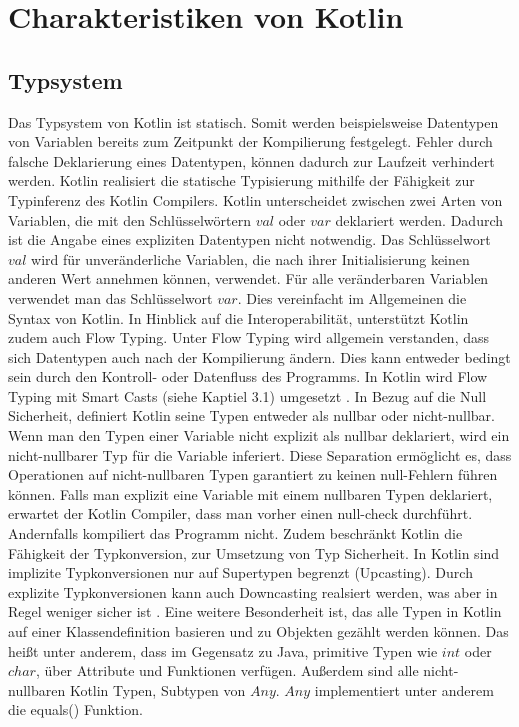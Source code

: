 \documentclass{article}
\begin{document}
\section{Charakteristiken von Kotlin}
\subsection{Typsystem}
Das Typsystem von Kotlin ist statisch. Somit werden beispielsweise Datentypen von Variablen bereits zum Zeitpunkt der Kompilierung festgelegt. Fehler durch falsche Deklarierung eines Datentypen, können dadurch zur Laufzeit verhindert werden. Kotlin realisiert die statische Typisierung mithilfe der Fähigkeit zur Typinferenz des Kotlin Compilers. Kotlin unterscheidet zwischen zwei Arten von Variablen, die mit den Schlüsselwörtern $val$ oder $var$ deklariert werden.  Dadurch ist die Angabe eines expliziten Datentypen nicht notwendig. Das Schlüsselwort $val$ wird für unveränderliche Variablen, die nach ihrer Initialisierung keinen anderen Wert annehmen können, verwendet. Für alle veränderbaren Variablen verwendet man das Schlüsselwort $var$. Dies vereinfacht im Allgemeinen die Syntax von Kotlin. In Hinblick auf die Interoperabilität, unterstützt Kotlin zudem auch Flow Typing. Unter Flow Typing wird allgemein verstanden, dass sich Datentypen auch nach der Kompilierung ändern. Dies kann entweder bedingt sein durch den Kontroll- oder Datenfluss des Programms. In Kotlin wird Flow Typing mit Smart Casts (siehe Kaptiel 3.1) umgesetzt \cite{KotlinLangSpec}. \newline
In Bezug auf die Null Sicherheit, definiert Kotlin seine Typen entweder als nullbar oder nicht-nullbar. Wenn man den Typen einer Variable nicht explizit als nullbar deklariert, wird ein nicht-nullbarer Typ für die Variable inferiert. Diese Separation ermöglicht es, dass Operationen auf nicht-nullbaren Typen garantiert zu keinen null-Fehlern führen können. Falls man explizit eine Variable mit einem nullbaren Typen deklariert, erwartet der Kotlin Compiler, dass man vorher einen null-check durchführt. Andernfalls kompiliert das Programm nicht. Zudem beschränkt Kotlin die Fähigkeit der Typkonversion, zur Umsetzung von Typ Sicherheit. In Kotlin sind implizite Typkonversionen nur auf Supertypen begrenzt (Upcasting). Durch explizite Typkonversionen kann auch Downcasting realsiert werden, was aber in Regel weniger sicher ist \cite{KotlinLangSpec}.\newline
Eine weitere Besonderheit ist, das alle Typen in Kotlin auf einer Klassendefinition basieren und zu Objekten gezählt werden können. Das heißt unter anderem, dass im Gegensatz zu Java, primitive Typen wie $int$ oder $char$, über Attribute und Funktionen verfügen. Außerdem sind alle nicht-nullbaren Kotlin Typen, Subtypen von $Any$. $Any$ implementiert unter anderem die equals() Funktion.
\end{document}
